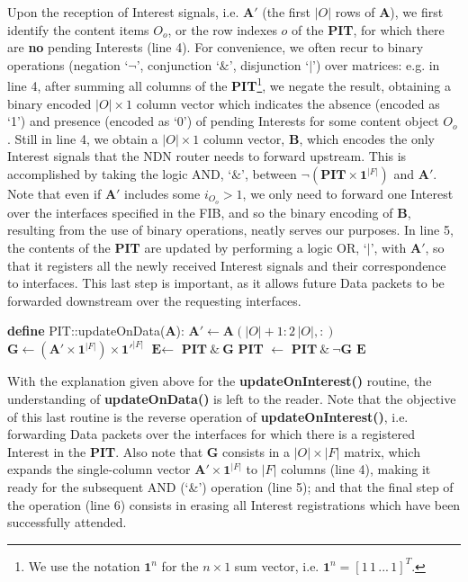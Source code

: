 Upon the reception of Interest signals, i.e. $\textbf{A}'$ (the first $|O|$ rows 
of $\textbf{A}$), we first identify the content items $O_o$, or the row indexes $o$ of the 
\textbf{PIT}, for which there are \textbf{no} pending Interests (line 4). For 
convenience, we often recur to binary operations (negation `$\neg$', 
conjunction `$\&$', disjunction `$|$') over matrices: e.g. in line 4, after 
summing all columns of the \textbf{PIT}\footnote{We use the notation $\textbf{1}^{n}$ for the $n \times 1$
sum vector, i.e. $\textbf{1}^{n} = [1\,1\,...\,1]^{T}$.}, we negate the 
result, obtaining a binary encoded $|O| \times 1$ 
column vector which indicates the absence (encoded as  `1') and presence 
(encoded as `0') of pending Interests for some content object $O_o$. Still in 
line 4, we obtain a $|O| \times 1$ column vector, $\textbf{B}$, which encodes the 
only Interest signals that the NDN router needs to forward upstream. This is 
accomplished by taking the logic AND, `$\&$', between $\neg(\textbf{PIT} \times \textbf{1}^{|F|})$ and 
$\textbf{A}'$. Note that even 
if $\textbf{A}'$ includes some $i_{O_o} > 1$, we only need to forward one Interest 
over the interfaces specified in the FIB, and so the binary encoding of $\textbf{B}$, 
resulting from the use of binary operations, neatly serves our purposes. 
In line 5, the 
contents of the \textbf{PIT} are updated by performing a logic OR, `$|$', with $\textbf{A}'$, so 
that it registers all the newly received 
Interest signals and their correspondence to interfaces. This last step is important, 
as it allows future Data packets to be forwarded downstream over the requesting 
interfaces.\shortvertbreak

\begin{algorithmic}[1]

\State \textbf{define} PIT::updateOnData($\textbf{A}$):
\State
    \State $\textbf{A}' \leftarrow \textbf{A}(|O|+1:2\,|O|,:)$
    \State $\textbf{G} \leftarrow (\textbf{A}' \times \textbf{1}^{|F|}) \times \textbf{1}'^{|F|}$
    \State $\textbf{E} \leftarrow$ $\textbf{PIT} \ \& \ \textbf{G}$
    \State \textbf{PIT} $\leftarrow$ $\textbf{PIT} \ \& \ \neg\textbf{G}$ 
    \State \Return $\textbf{E}$

\end{algorithmic}\shortvertbreak

With the explanation given above for the \textbf{updateOnInterest()} routine, 
the understanding of \textbf{updateOnData()} is left to the reader. Note that 
the objective of this last routine is the reverse operation of \textbf{updateOnInterest()}, i.e. forwarding Data 
packets over the interfaces for which there is a registered Interest in the \textbf{PIT}. Also 
note that $\textbf{G}$ consists in a $|O| \times |F|$ matrix, which expands the single-column 
vector $\textbf{A}' \times \textbf{1}^{|F|}$ to $|F|$ columns (line 4), making it ready 
for the subsequent AND (`\&') operation (line 5); and that the final 
step of the operation (line 6) consists in erasing 
all Interest registrations which have been successfully attended.\shortvertbreak

